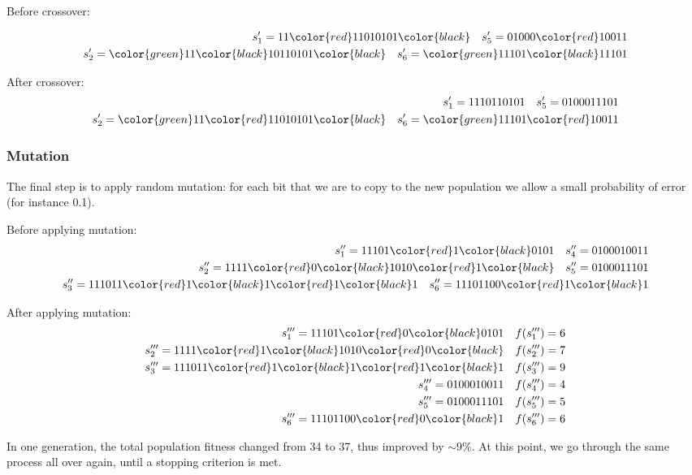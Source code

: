 Before crossover:

\begin{align*}
    s_1' = 11 \color{red} 11010101 \color{black} \quad s_5' = 01000 \color{red} 10011 \\
    s_2' = \color{green} 11 \color{black} 10110101 \color{black} \quad s_6' = \color{green} 11101 \color{black} 11101 
\end{align*}

After crossover:
\begin{align*}
    s_1' = 11 10110101 \quad s_5' = 01 00011101 \\
    s_2' = \color{green} 11 \color{red} 11010101 \color{black} \quad s_6' = \color{green} 11101 \color{red} 10011 
\end{align*}

\subsubsection{Mutation}
The final step is to apply random mutation: for each bit that we are to copy to the new population we allow a small probability of error (for instance 0.1).

Before applying mutation:
\begin{align*}
    s_1'' = 11101\color{red}1 \color{black}0101 \quad s_4'' = 0100010011 \\
    s_2'' = 1111\color{red}0 \color{black}1010\color{red}1 \color{black} \quad s_5'' = 0100011101 \\
    s_3'' = 111011\color{red}1 \color{black}1 \color{red}1 \color{black}1 \quad s_6'' = 11101100\color{red}1 \color{black}1 
\end{align*}

After applying mutation:
\begin{align*}
    s_1''' = 11101\color{red} 0 \color{black} 0101 \quad f(s_1''') = 6 \\
    s_2''' = 1111\color{red} 1 \color{black} 1010 \color{red} 0 \color{black} \quad f(s_2''') = 7 \\
    s_3''' = 111011\color{red} 1 \color{black} 1 \color{red} 1 \color{black} 1 \quad f(s_3''') = 9 \\
    s_4''' = 0100010011 \quad f(s_4''') = 4 \\
    s_5''' = 0100011101 \quad f(s_5''') = 5 \\
    s_6''' = 11101100\color{red} 0 \color{black} 1 \quad f(s_6''') = 6 
\end{align*}

In one generation, the total population fitness changed from 34 to 37, thus improved by $\sim 9 \%$. At this point, we go through the same process all over again, until a stopping criterion is met.

